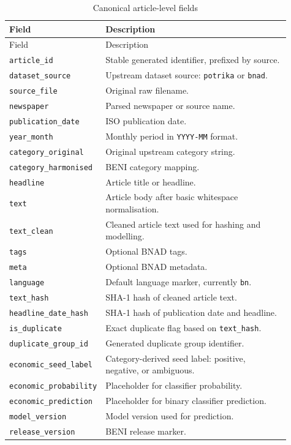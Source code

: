 \documentclass[11pt]{article}
\begin{document}
\begin{longtable}{L{0.25\linewidth}L{0.66\linewidth}}
\caption{Canonical article-level fields}
\label{tab:schema}\\
\toprule
Field & Description\\
\midrule
\endfirsthead
\toprule
Field & Description\\
\midrule
\endhead
\texttt{article\_id} & Stable generated identifier, prefixed by source.\\
\texttt{dataset\_source} & Upstream dataset source: \texttt{potrika} or \texttt{bnad}.\\
\texttt{source\_file} & Original raw filename.\\
\texttt{newspaper} & Parsed newspaper or source name.\\
\texttt{publication\_date} & ISO publication date.\\
\texttt{year\_month} & Monthly period in \texttt{YYYY-MM} format.\\
\texttt{category\_original} & Original upstream category string.\\
\texttt{category\_harmonised} & BENI category mapping.\\
\texttt{headline} & Article title or headline.\\
\texttt{text} & Article body after basic whitespace normalisation.\\
\texttt{text\_clean} & Cleaned article text used for hashing and modelling.\\
\texttt{tags} & Optional BNAD tags.\\
\texttt{meta} & Optional BNAD metadata.\\
\texttt{language} & Default language marker, currently \texttt{bn}.\\
\texttt{text\_hash} & SHA-1 hash of cleaned article text.\\
\texttt{headline\_date\_hash} & SHA-1 hash of publication date and headline.\\
\texttt{is\_duplicate} & Exact duplicate flag based on \texttt{text\_hash}.\\
\texttt{duplicate\_group\_id} & Generated duplicate group identifier.\\
\texttt{economic\_seed\_label} & Category-derived seed label: positive, negative, or ambiguous.\\
\texttt{economic\_probability} & Placeholder for classifier probability.\\
\texttt{economic\_prediction} & Placeholder for binary classifier prediction.\\
\texttt{model\_version} & Model version used for prediction.\\
\texttt{release\_version} & BENI release marker.\\
\bottomrule
\end{longtable}
\end{document}
